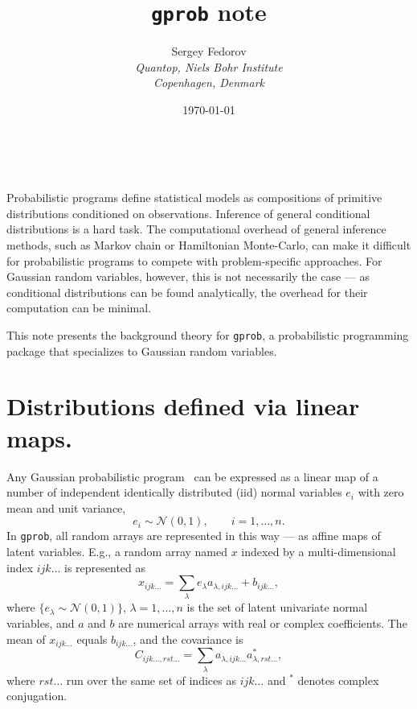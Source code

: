 \documentclass[a4paper,notitlepage]{article}
\makeatletter
\renewcommand{\maketitle}{\bgroup\setlength{\parindent}{0pt}
	\begin{center}
		\LARGE{\@title}
	\end{center}	
	\begin{flushright}
		\small{\@author}\\
		\small{\@date}
	\end{flushright}\egroup
}
\makeatother
\begin{document}
\title{\texttt{gprob} note}
\author{
Sergey Fedorov\\
\emph{Quantop, Niels Bohr Institute \\Copenhagen, Denmark}}
\date{\today}
\maketitle

Probabilistic programs define statistical models as compositions of primitive distributions conditioned on observations.
Inference of general conditional distributions is a hard task. 
The computational overhead of general inference methods, such as Markov chain or Hamiltonian Monte-Carlo, can make it difficult for probabilistic programs to compete with problem-specific approaches. 
For Gaussian random variables, however, this is not necessarily the case --- as conditional distributions can be found analytically, the overhead for their computation can be minimal.


This note presents the background theory for \texttt{gprob}, a probabilistic programming package that specializes to Gaussian random variables. 


\section{Distributions defined via linear maps.}

Any Gaussian probabilistic program~\cite{stein_compositional_2021} can be expressed as a linear map of a number of independent identically distributed (iid) normal variables $e_i$ with zero mean and unit variance,
\begin{equation}
e_i \sim \mathcal{N}(0,1),\qquad i=1,\ldots,n.
\end{equation} 
In \texttt{gprob}, all random arrays are represented in this way --- as affine maps of latent variables. E.g., a random array named $x$ indexed by a multi-dimensional index $ijk\ldots$ is represented as
\begin{equation}
x_{ijk\ldots}=\sum_\lambda e_\lambda a_{\lambda, ijk\ldots}+b_{ijk\ldots},
\end{equation}
where $\{e_\lambda\sim \mathcal{N}(0,1)\}$, $\lambda = 1,\ldots,n$ is the set of latent univariate normal variables, and $a$ and $b$ are numerical arrays with real or complex coefficients. The mean of $x_{ijk\ldots}$ equals $b_{ijk\ldots}$, and the covariance is
\begin{equation}
C_{ijk\ldots,rst\ldots}=\sum_{\lambda} a_{\lambda, ijk\ldots} a^*_{\lambda, rst\ldots},
\end{equation}
where $rst\ldots$ run over the same set of indices as $ijk\ldots$ and $^*$ denotes complex conjugation.
\end{document}
